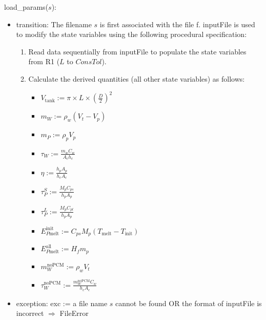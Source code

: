 \documentclass[12pt]{article}
\begin{document}
\noindent load\_params($s$):
\begin{itemize}
\item transition: The filename $s$ is first associated with the file f.  {inputFile} is used to
  modify the state variables using the following procedural specification:
\begin{enumerate}
\item Read data sequentially from inputFile to populate the state variables from
  R1 ($L$ to $\mathit{ConsTol}$).
\item Calculate the derived quantities (all other state variables) as follows:
\begin{itemize}
\item $V_{\text{tank}} := \pi \times L \times (\frac{D}{2}) ^ 2$
\item $m_W := \rho_w (V_t - V_p)$
\item $m_P := \rho_p V_p$
\item $\tau_W := \frac{m_w C_w}{A_c h_c}$
\item $\eta := \frac{h_p A_p}{h_c A_c}$
\item $\tau_P^S := \frac{M_p C_{ps}}{h_p A_p}$
\item $\tau_P^L := \frac{M_p C_{pl}}{h_p A_p}$
\item $E_{P\text{melt}}^{\text{init}} := C_{ps} M_p (T_{\text{melt}} - T_{\text{init}})$
\item $E_{P\text{melt}}^{\text{all}} := H_f m_p$
\item $m_W^{\text{noPCM}} := \rho_w  V_t$
\item $\tau_W^{\text{noPCM}} := \frac{m_W^{\text{noPCM}} C_w}{h_c A_c}$
\end{itemize}
\end{enumerate}

\item exception: exc := a file name $s$ cannot be found OR the format of
  inputFile is incorrect $\Rightarrow$  FileError
\end{itemize}
\end{document}
